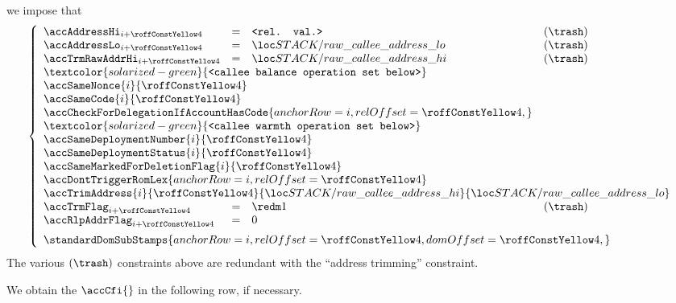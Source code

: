 \item[\underline{\underline{First \calleeName{} account-row $n^°(i + \callFirstCalleeAccountRowOffset)$:}}]
	we impose that
	\[
		\left\{ \begin{array}{lcll}
			\accAddressHi    _{i + \callFirstCalleeAccountRowOffset} & = & \relevantValue   & (\trash) \\
			\accAddressLo    _{i + \callFirstCalleeAccountRowOffset} & = & \locStackRawAddressLo & (\trash) \\
			\accTrmRawAddrHi _{i + \callFirstCalleeAccountRowOffset} & = & \locStackRawAddressHi & (\trash) \\
			\multicolumn{4}{l}{\textcolor{solarized-green}{\texttt{<callee balance operation set below>}}} \\
			\multicolumn{4}{l}{\accSameNonce             {i}{\callFirstCalleeAccountRowOffset}} \\
			\multicolumn{4}{l}{\accSameCode              {i}{\callFirstCalleeAccountRowOffset}} \\
			\multicolumn{3}{l}{\accCheckForDelegationIfAccountHasCode {
				anchorRow = i                                ,
				relOffset = \callFirstCalleeAccountRowOffset ,
			}} \\
			\multicolumn{4}{l}{\textcolor{solarized-green}{\texttt{<callee warmth operation set below>}}} \\
			\multicolumn{4}{l}{\accSameDeploymentNumber  {i}{\callFirstCalleeAccountRowOffset}} \\
			\multicolumn{4}{l}{\accSameDeploymentStatus  {i}{\callFirstCalleeAccountRowOffset}} \\
			\multicolumn{4}{l}{\accSameMarkedForDeletionFlag {i}{\callFirstCalleeAccountRowOffset}} \\
			\multicolumn{4}{l}{\accDontTriggerRomLex { anchorRow = i, relOffset = \callFirstCalleeAccountRowOffset } } \\
			\multicolumn{4}{l}{\accTrimAddress
			{i}{\callFirstCalleeAccountRowOffset}
			{\locStackRawAddressHi}
			{\locStackRawAddressLo}} \\
			\accTrmFlag      _{i + \callFirstCalleeAccountRowOffset} & = & \rOne & (\trash) \\
			\accRlpAddrFlag  _{i + \callFirstCalleeAccountRowOffset} & = & 0 \vspace{2mm} \\
			\multicolumn{4}{l}{
				\standardDomSubStamps {
					anchorRow = i                                ,
					relOffset = \callFirstCalleeAccountRowOffset ,
					domOffset = \callFirstCalleeAccountRowOffset ,
				}
			} \\
		\end{array} \right.
	\]
	\saNote{}
	The various $(\trash)$ constraints above are redundant with the ``address trimming'' constraint.

	\saNote{}
	We obtain the $\accCfi{}$ in the following row, if necessary.

